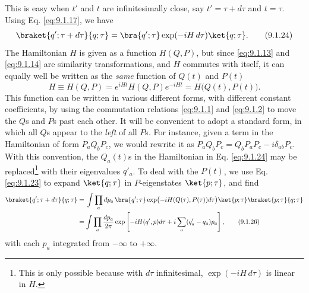 This is easy when $t'$ and $t$ are infinitesimally close, say
$t'=\tau+d\tau$ and $t=\tau$. Using Eq. \eqref{eq:9.1.17}, we have
\begin{equation}
  \braket{q';\tau+d\tau}{q;\tau}
  =\bra{q';\tau}\exp(-iH\,d\tau)\ket{q;\tau}.
  \tag{9.1.24}\label{eq:9.1.24}
\end{equation}
The Hamiltonian $H$ is given as a function $H(Q,P)$, but since \eqref{eq:9.1.13}
and \eqref{eq:9.1.14} are similarity transformations, and $H$ commutes with itself,
it can equally well be written as the \emph{same} function of $Q(t)$ and
$P(t)$
\begin{equation}
  H\equiv H(Q,P)=e^{iHt}H(Q,P)e^{-iHt}=H\bigl(Q(t),P(t)\bigr).
  \tag{9.1.25}\label{eq:9.1.25}
\end{equation}
This function can be written in various different forms, with different
constant coefficients, by using the commutation relations \eqref{eq:9.1.1} and
\eqref{eq:9.1.2} to move the $Q$s and $P$s past each other. It will be convenient to
adopt a standard form, in which all $Q$s appear to the \emph{left} of all
$P$s. For instance, given a term in the Hamiltonian of form $P_aQ_bP_c$,
we would rewrite it as $P_aQ_bP_c=Q_bP_aP_c-i\delta_{ab}P_c$. With this
convention, the $Q_a(t)$s in the Hamiltonian in Eq. \eqref{eq:9.1.24} may be
replaced\footnote{This is only possible because with $d\tau$ infinitesimal,
$\exp(-iH\,d\tau)$ is linear in $H$.} with their eigenvalues $q'_a$. To deal
with the $P(t)$, we use Eq. \eqref{eq:9.1.23} to expand $\ket{q;\tau}$ in
$P$-eigenstates $\ket{p;\tau}$, and find
\begin{align}
  \braket{q';\tau+d\tau}{q;\tau}
  &={}
  \int\prod_a dp_a\,
  \bra{q';\tau}\exp\bigl(-iH(Q(\tau),P(\tau))d\tau\bigr)\ket{p;\tau}
  \braket{p;\tau}{q;\tau}
  \notag\\
  &=\int\prod_a\frac{dp_a}{2\pi}
  \exp\left[-iH(q',p)d\tau+i\sum_a(q'_a-q_a)p_a\right],
  \tag{9.1.26}\label{eq:9.1.26}
\end{align}
with each $p_a$ integrated from $-\infty$ to $+\infty$.


